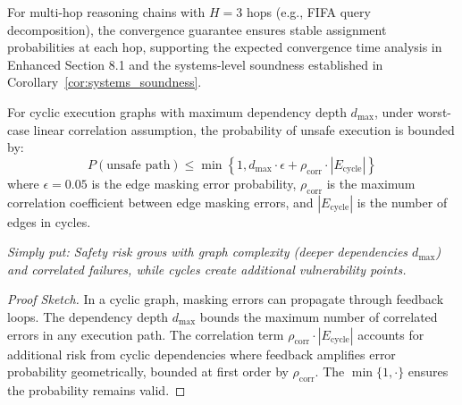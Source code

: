 \documentclass{article}
\begin{document}
\begin{remark}
For multi-hop reasoning chains with $H = 3$ hops (e.g., FIFA query decomposition), the convergence guarantee ensures stable assignment probabilities at each hop, supporting the expected convergence time analysis in Enhanced Section 8.1 and the systems-level soundness established in Corollary~\ref{cor:systems_soundness}.
\end{remark}


\begin{theorem}
For cyclic execution graphs with maximum dependency depth $d_{\max}$, under worst-case linear correlation assumption, the probability of unsafe execution is bounded by:
\begin{equation}
P(\text{unsafe path}) \leq \min\left\{1, d_{\max} \cdot \epsilon + \rho_{\text{corr}} \cdot |E_{\text{cycle}}|\right\}
\end{equation}%
where $\epsilon = 0.05$ is the edge masking error probability, $\rho_{\text{corr}}$ is the maximum correlation coefficient between edge masking errors, and $|E_{\text{cycle}}|$ is the number of edges in cycles.

\textit{Simply put: Safety risk grows with graph complexity (deeper dependencies $d_{\max}$) and correlated failures, while cycles create additional vulnerability points.}
\end{theorem}

\begin{proof}[Proof Sketch]
In a cyclic graph, masking errors can propagate through feedback loops. The dependency depth $d_{\max}$ bounds the maximum number of correlated errors in any execution path. The correlation term $\rho_{\text{corr}} \cdot |E_{\text{cycle}}|$ accounts for additional risk from cyclic dependencies where feedback amplifies error probability geometrically, bounded at first order by $\rho_{\text{corr}}$. The $\min\{1, \cdot\}$ ensures the probability remains valid.
\end{proof}

\end{document}
